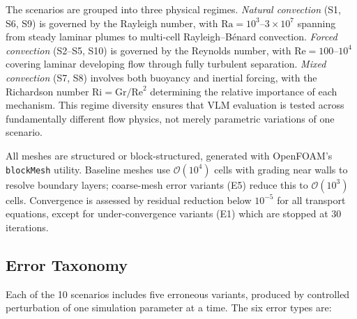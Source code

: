 \documentclass[preprint,12pt]{elsarticle}
\begin{document}
The scenarios are grouped into three physical regimes. \emph{Natural convection}
(S1, S6, S9) is governed by the Rayleigh number, with
$\mathrm{Ra} = 10^{3}$--$3 \times 10^{7}$ spanning from steady laminar
plumes to multi-cell Rayleigh--B\'{e}nard convection. \emph{Forced convection}
(S2--S5, S10) is governed by the Reynolds number, with
$\mathrm{Re} = 100$--$10^{4}$ covering laminar developing flow through
fully turbulent separation. \emph{Mixed convection} (S7, S8) involves both
buoyancy and inertial forcing, with the Richardson number
$\mathrm{Ri} = \mathrm{Gr}/\mathrm{Re}^{2}$ determining the relative
importance of each mechanism. This regime diversity ensures that VLM
evaluation is tested across fundamentally different flow physics, not merely
parametric variations of one scenario.

All meshes are structured or block-structured, generated with OpenFOAM's
\texttt{blockMesh} utility. Baseline meshes use $\mathcal{O}(10^{4})$ cells
with grading near walls to resolve boundary layers; coarse-mesh error variants
(E5) reduce this to $\mathcal{O}(10^{3})$ cells. Convergence is assessed by
residual reduction below $10^{-5}$ for all transport equations, except for
under-convergence variants (E1) which are stopped at 30 iterations.

\subsection{Error Taxonomy}
\label{sec:error-taxonomy}

Each of the 10 scenarios includes five erroneous variants, produced by controlled
perturbation of one simulation parameter at a time. The six error types are:
\end{document}
